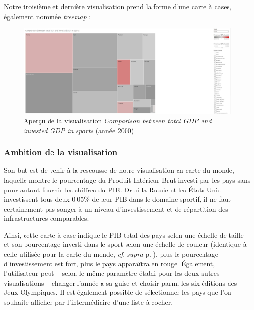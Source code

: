 \documentclass[hidelinks, 12pt]{report}
\begin{document}
Notre troisième et dernière visualisation prend la forme d'une carte à cases, également nommée \textit{treemap} :

\begin{center}
	\begin{figure}[H]
		\centering
		\setlength{\belowcaptionskip}{-35pt}
		\includegraphics[scale=0.25]{images/datavis-medals-world-treemap.jpeg}
		\captionsetup{justification=centering}
		\caption{Aperçu de la visualisation \textit{Comparison between total GDP and invested GDP in sports} (année 2000)}
	\end{figure}
\end{center}

\subsubsection{Ambition de la visualisation}

Son but est de venir à la rescousse de notre visualisation en carte du monde, laquelle montre le pourcentage du Produit Intérieur Brut investi par les pays sans pour autant fournir les chiffres du PIB. Or si la Russie et les États-Unis investissent tous deux 0.05\% de leur PIB dans le domaine sportif, il ne faut certainement pas songer à un niveau d'investissement et de répartition des infrastructures comparables.

Ainsi, cette carte à case indique le PIB total des pays selon une échelle de taille et son pourcentage investi dans le sport selon une échelle de couleur (identique à celle utilisée pour la carte du monde, \textit{cf}. \textit{supra} p. \pageref{color}), plus le pourcentage d'investissement est fort, plus le pays apparaîtra en rouge. Également, l'utilisateur peut -- selon le même paramètre établi pour les deux autres visualisations -- changer l'année à sa guise et choisir parmi les six éditions des Jeux Olympiques. Il est également possible de sélectionner les pays que l'on souhaite afficher par l'intermédiaire d'une liste à cocher.
\end{document}
